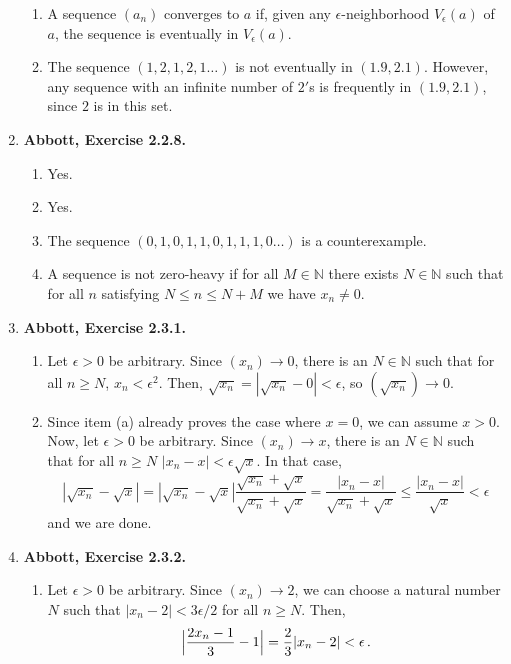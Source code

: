 \documentclass{article}
\DeclarePairedDelimiter\abs{\lvert}{\rvert}
\newcommand{\N}{\mathbb{N}}
\newcommand{\exc}[2][Abbott]{\item \textbf{#1, Exercise #2.}}
\begin{document}
\begin{enumerate}
\begin{enumerate}
		\item A sequence $(a_n)$ converges to $a$ if, given any $\epsilon$-neighborhood $V_\epsilon(a)$ of $a$, the sequence is eventually in $V_\epsilon(a)$.
		      		      		      	      	      	      	                  
		\item The sequence $(1,2,1,2,1\dots)$ is not eventually in $(1.9, 2.1)$. However, any sequence with an infinite number of $2'$s is frequently in $(1.9, 2.1)$, since $2$ is in this set. 
	\end{enumerate}
				      	              
	\exc{2.2.8}
				      	              
	\begin{enumerate}
		\item Yes.
		\item Yes.
		\item The sequence $(0, 1, 0, 1, 1, 0, 1,1,1, 0 \dots)$ is a counterexample.
		\item A sequence is not zero-heavy if for all $M \in \N$ there exists $N \in \N$ such that for all $n$ satisfying $N \leq n \leq N + M$ we have $x_n \neq 0$.
	\end{enumerate}
				      	              
	\exc{2.3.1}
	\begin{enumerate}
		\item  Let $\epsilon > 0$ be arbitrary. Since $(x_n) \rightarrow 0$, there is an $N \in \N$ such that for all $n \geq N$, $x_n < \epsilon^2$. Then, $\sqrt{x_n} = |\sqrt{x_n} - 0| < \epsilon$, so $(\sqrt{x_n}) \rightarrow 0$.
		      		      		      	      	      	      	                  
		\item Since item (a) already proves the case where $x = 0$, we can assume $x > 0$. Now, let $\epsilon > 0$ be arbitrary. Since $(x_n) \rightarrow x$, there is an $N \in \N$ such that for all $n \geq N$ $|x_n-x| < \epsilon \sqrt{x}$. In that case, \begin{equation*}
		      |\sqrt{x_n}-\sqrt{x}| = |\sqrt{x_n}-\sqrt{x}| \frac{\sqrt{x_n}+ \sqrt{x}}{\sqrt{x_n}+ \sqrt{x}} = \frac{|x_n-x|}{\sqrt{x_n}+\sqrt{x}} \leq \frac{|x_n-x|}{\sqrt{x}} < \epsilon
		\end{equation*}
		and we are done.
	\end{enumerate}
				      	              
	\exc{2.3.2}
				      	              
	\begin{enumerate}
		\item Let $\epsilon > 0$ be arbitrary. Since $(x_n) \rightarrow 2$, we can choose a natural number $N$ such that $|x_n-2| < 3\epsilon/2$ for all $n \geq N$. Then, \begin{equation*}
		      \abs[\Big]{\frac{2x_n-1}{3}-1} = \frac{2}{3}|x_n-2| < \epsilon \, .
		\end{equation*}
							      		      	            

\end{enumerate}
\end{enumerate}
\end{document}
